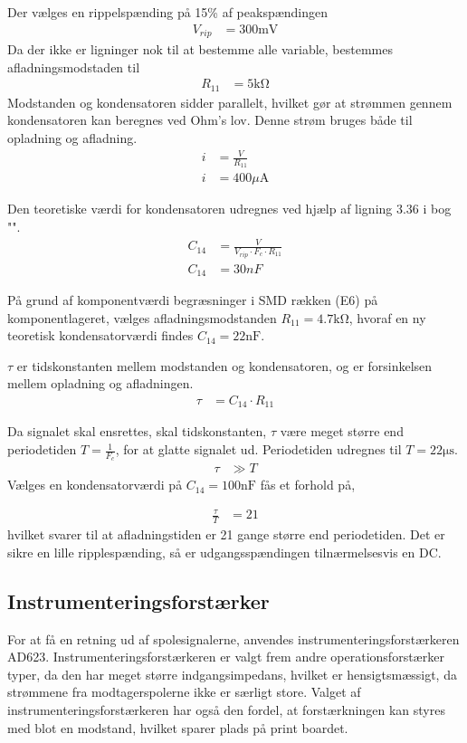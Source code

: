 Der vælges en rippelspænding på 15\% af peakspændingen
\begin{align}
	V_{rip} & = 300 \si{\milli\volt} \nonumber
\end{align}
Da der ikke er ligninger nok til at bestemme alle variable, bestemmes afladningsmodstaden til
\begin{align}
	R_{11} & = 5 \si{\kilo\ohm} \nonumber
\end{align}
Modstanden og kondensatoren sidder parallelt, hvilket gør at strømmen gennem kondensatoren kan beregnes ved Ohm's lov. Denne strøm bruges både til opladning og afladning.
\begin{align}
	i & = \frac{V}{R_{11}} \\
	i & = 400 \si{\mu\ampere}\nonumber
\end{align}

Den teoretiske værdi for kondensatoren udregnes ved hjælp af ligning 3.36 i bog "\cite[side. 160]{Sedra19uu}".
\begin{align}
	C_{14} & = \frac{V}{V_{rip} \cdot F_c \cdot R_{11}}\\
		C_{14} & = 30nF \nonumber
\end{align}

	
På grund af komponentværdi begræsninger i SMD rækken (E6) på komponentlageret, vælges afladningsmodstanden $R_{11} = 4.7 \si{\kilo\ohm}$, hvoraf en ny teoretisk kondensatorværdi findes $C_{14} = 22 \si{\nano\farad}$.


$\tau$ er tidskonstanten mellem modstanden og kondensatoren, og er forsinkelsen mellem opladning og afladningen. 
\begin{align}
		\tau & = C_{14} \cdot R_{11}
\end{align}

Da signalet skal ensrettes, skal tidskonstanten, $\tau$ være meget større end periodetiden $T = \frac{1}{F_c}$, for at glatte signalet ud. Periodetiden udregnes til $T = 22 \si{\micro\second}$.
\begin{align}
		\tau & \gg T \nonumber
\end{align}
Vælges en kondensatorværdi på $C_{14} = 100 \si{\nano\farad}$ fås et forhold på,

\begin{align}
	\frac{\tau}{T} & = 21
\end{align}
hvilket svarer til at afladningstiden er 21 gange større end periodetiden. Det er sikre en lille ripplespænding, så er udgangsspændingen tilnærmelsesvis en DC.

\subsection{Instrumenteringsforstærker}
For at få en retning ud af spolesignalerne, anvendes instrumenteringsforstærkeren AD623. Instrumenteringsforstærkeren er valgt frem andre operationsforstærker typer, da den har meget større indgangsimpedans, hvilket er hensigtsmæssigt, da strømmene fra modtagerspolerne ikke er særligt store. Valget af instrumenteringsforstærkeren har også den fordel, at forstærkningen kan styres med blot en modstand, hvilket sparer plads på print boardet.


